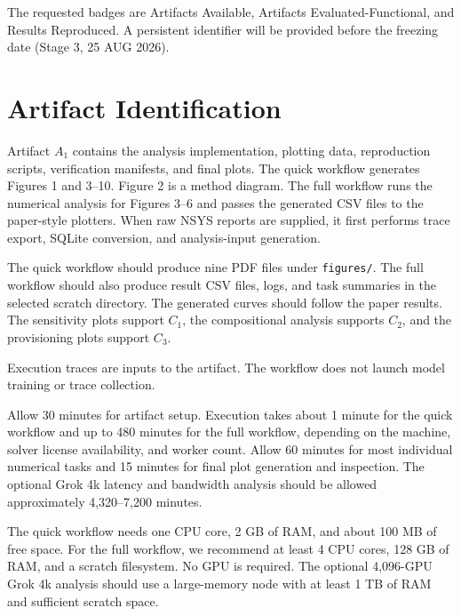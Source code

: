 \documentclass[conference]{IEEEtran}
\begin{document}
The requested badges are Artifacts Available, Artifacts
Evaluated-Functional, and Results Reproduced. A persistent identifier
will be provided before the freezing date (Stage 3, 25 AUG 2026).

\section{Artifact Identification}

\newartifact

\artrel

Artifact $A_1$ contains the analysis implementation, plotting data,
reproduction scripts, verification manifests, and final plots. The
quick workflow generates Figures 1 and 3--10. Figure 2 is a method
diagram. The full workflow runs the numerical analysis for Figures 3--6
and passes the generated CSV files to the paper-style plotters. When raw
NSYS reports are supplied, it first performs trace export, SQLite
conversion, and analysis-input generation.

\artexp

The quick workflow should produce nine PDF files under
\texttt{figures/}. The full workflow should also produce result CSV
files, logs, and task summaries in the selected scratch directory. The
generated curves should follow the paper results.
The sensitivity plots support $C_1$, the compositional analysis supports
$C_2$, and the provisioning plots support $C_3$.

Execution traces are inputs to the artifact. The workflow does not launch
model training or trace collection.

\arttime

Allow 30 minutes for artifact setup. Execution takes about 1 minute for
the quick workflow and up to 480 minutes for the full workflow, depending
on the machine, solver license availability, and worker count. Allow
60 minutes for most individual numerical tasks and 15 minutes for final
plot generation and inspection. The optional Grok 4k latency and bandwidth
analysis should be allowed approximately 4,320--7,200 minutes.

\artin


The quick workflow needs one CPU core, 2 GB of RAM, and about 100 MB of
free space. For the full workflow, we recommend at least 4 CPU cores,
128 GB of RAM, and a scratch filesystem. No GPU is required. The optional
4,096-GPU Grok 4k analysis should use a large-memory node with at least
1 TB of RAM and sufficient scratch space.
\end{document}
